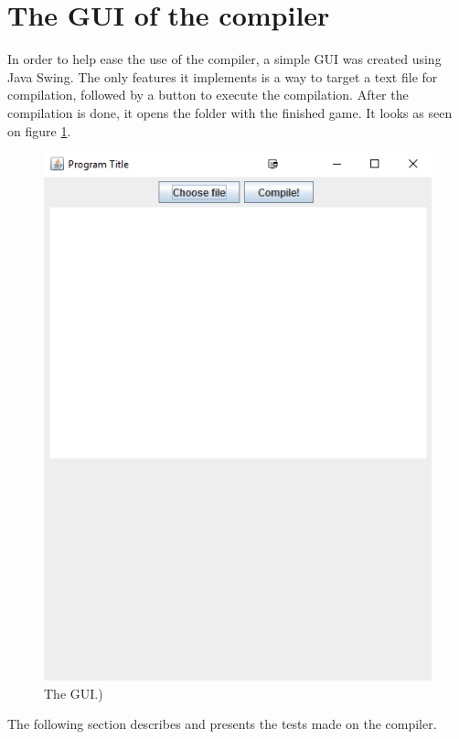 \section{The GUI of the \lang{} compiler}
In order to help ease the use of the \lang{} compiler, a simple GUI was created using Java Swing\cite{swing}. The only features it implements is a way to target a text file for compilation, followed by a button to execute the compilation. After the compilation is done, it opens the folder with the finished game. It looks as seen on figure \ref{fig:GUI}.
\begin{figure}[H]
\centering
\includegraphics[scale=0.5]{resources/Images/Udklip.PNG}
\caption{The \lang{} GUI.)}\label{fig:GUI}
\end{figure}

The following section describes and presents the tests made on the \lang{} compiler.